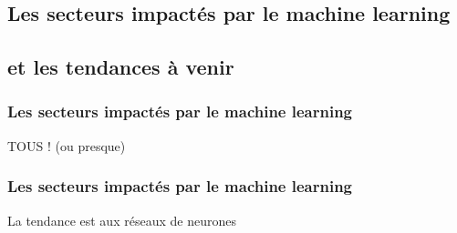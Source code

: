 \subsection{Les secteurs impactés par le machine learning}
\subsection{et les tendances à venir}

\begin{frame}
  \frametitle{Les secteurs impactés par le machine learning}
  \begin{center}
    \huge TOUS ! (ou presque)
  \end{center}
\end{frame}

\begin{frame}
  \frametitle{Les secteurs impactés par le machine learning}
  \begin{center}
    La tendance est aux réseaux de neurones
  \end{center}
  $\;$ \\
  \begin{minipage}[c]{0.49\linewidth}
  \end{minipage}\hfill
  \begin{minipage}[c]{0.49\linewidth}
  \end{minipage}\hfill
\end{frame}

